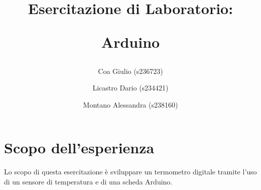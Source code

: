 \documentclass[a4paper]{article}
\title{
		\begin{center}
			Esercitazione di Laboratorio:
		\end{center}
		\newline
		\begin{center}
			Arduino
		\end{center}
	}
\author{
	Coa Giulio (s236723)
	\and
	Licastro Dario (s234421)
	\and
	Montano Alessandra (s238160)
}
\begin{document}
	\begin{titlingpage}
		\maketitle
	\end{titlingpage}
	\newpage
	\section{Scopo dell'esperienza}
		Lo scopo di questa esercitazione è sviluppare un termometro digitale tramite l'uso di un sensore di temperatura e di una scheda Arduino.
\end{document}

